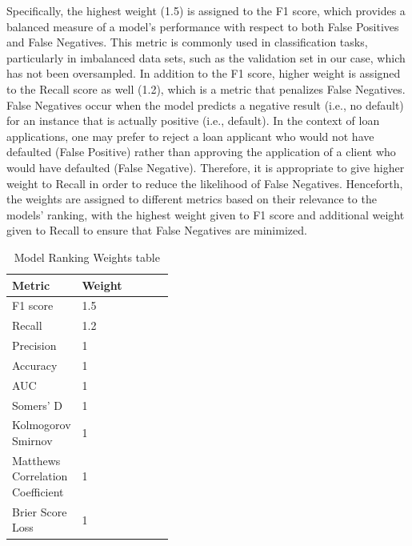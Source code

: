 Specifically, the highest weight (1.5) is assigned to the F1 score, which provides a balanced measure of a model's performance with respect to both False Positives and False Negatives.
This metric is commonly used in classification tasks, particularly in imbalanced data sets, such as the validation set in our case, which has not been oversampled.
In addition to the F1 score, higher weight is assigned to the Recall score as well (1.2), which is a metric that penalizes False Negatives.
False Negatives occur when the model predicts a negative result (i.e., no default) for an instance that is actually positive (i.e., default).
In the context of loan applications, one may prefer to reject a loan applicant who would not have defaulted (False Positive) rather than approving the application of a client who would have defaulted (False Negative). Therefore, it is appropriate to give higher weight to Recall in order to reduce the likelihood of False Negatives.
Henceforth, the weights are assigned to different metrics based on their relevance to the models' ranking, with the highest weight given to F1 score and additional weight given to Recall to ensure that False Negatives are minimized.

\begin{table}[H]
\small
\setlength{\tabcolsep}{8pt}
\renewcommand{\arraystretch}{1.3}
\centering
    \caption[Model Ranking Weights table]{Model Ranking Weights table}\label{tab:weightsrank}
    \begin{tabular}{>{\raggedleft\arraybackslash}p{0.4\linewidth} l}
\toprule
\textbf{Metric} & \textbf{Weight}\\
\midrule
\hline
F1 score & 1.5 \\
Recall & 1.2 \\
Precision & 1 \\
Accuracy & 1 \\
AUC & 1 \\
Somers' D & 1 \\ 
Kolmogorov Smirnov & 1 \\
Matthews Correlation Coefficient  & 1 \\
Brier Score Loss  & 1 \\
\hline
\bottomrule
\end{tabular}
\vspace{0.7em}

\vspace{-1em}
\end{table}

